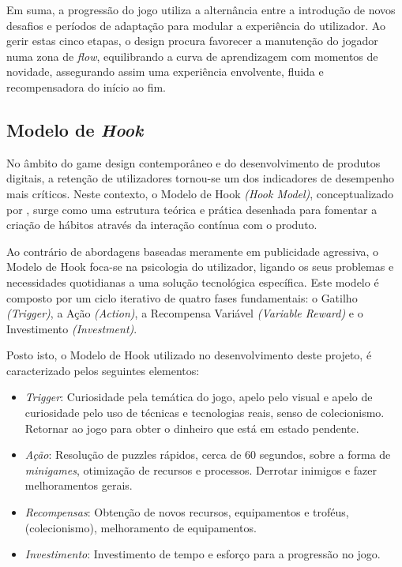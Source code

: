 Em suma, a progressão do jogo utiliza a alternância entre a introdução de novos 
desafios e períodos de adaptação para modular a experiência do utilizador. Ao gerir 
estas cinco etapas, o design procura favorecer a manutenção do jogador numa zona de \textit{flow}, 
equilibrando a curva de aprendizagem com momentos de novidade, assegurando assim uma 
experiência envolvente, fluida e recompensadora do início ao fim.

\subsection{Modelo de \textit{Hook}}

No âmbito do game design contemporâneo e do desenvolvimento de produtos digitais, a 
retenção de utilizadores tornou-se um dos indicadores de desempenho mais críticos. 
Neste contexto, o Modelo de Hook \textit{(Hook Model)}, conceptualizado por \textcite{modelo_hook}, 
surge como uma estrutura teórica e prática desenhada para fomentar a criação de 
hábitos através da interação contínua com o produto.

Ao contrário de abordagens baseadas meramente em publicidade agressiva, o Modelo de 
Hook foca-se na psicologia do utilizador, ligando os seus problemas e necessidades 
quotidianas a uma solução tecnológica específica. Este modelo é composto por um ciclo 
iterativo de quatro fases fundamentais: o Gatilho \textit{(Trigger)}, a Ação \textit{(Action)}, a 
Recompensa Variável \textit{(Variable Reward)} e o Investimento \textit{(Investment)}.

Posto isto, o Modelo de Hook utilizado no desenvolvimento deste projeto, é caracterizado
pelos seguintes elementos:

\begin{itemize}
    \item \textit{Trigger}: Curiosidade pela temática do jogo, apelo pelo visual e apelo de curiosidade pelo uso de técnicas e tecnologias reais, senso de colecionismo. Retornar ao jogo para obter o dinheiro que está em estado pendente.
    \item \textit{Ação}: Resolução de puzzles rápidos, cerca de 60 segundos, sobre a forma de \textit{minigames}, otimização de recursos e processos. Derrotar inimigos e fazer melhoramentos gerais.
    \item \textit{Recompensas}: Obtenção de novos recursos, equipamentos e troféus, (colecionismo), melhoramento de equipamentos.
    \item \textit{Investimento}: Investimento de tempo e esforço para a progressão no jogo.
\end{itemize}

